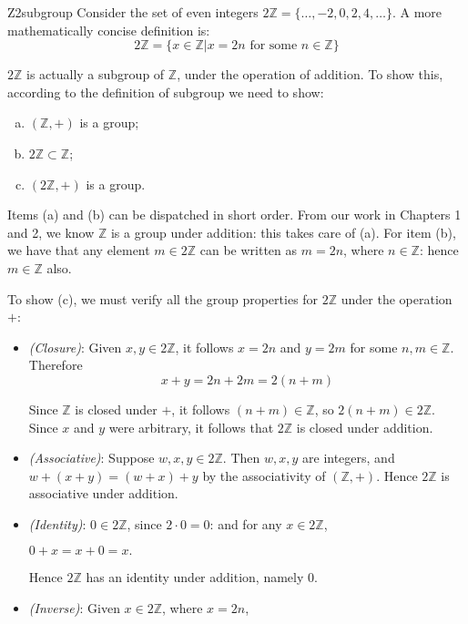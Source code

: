 \begin{example}{Z2subgroup}
Consider the set of even integers $2{\mathbb Z} = \{ \ldots, -2, 0, 2, 4, \ldots \}$. A more mathematically concise definition is:
\[
2{\mathbb Z} = \{x \in {\mathbb Z} | x = 2n \mbox{ for some } n \in {\mathbb Z} \} \]

$2{\mathbb Z}$ is actually a subgroup of ${\mathbb Z}$, under the operation of addition. To show this, according to the definition of subgroup we need to show:

\begin{enumerate}[(a)]
\item
$({\mathbb Z}, +)$ is a group;
\item
$2{\mathbb Z} \subset {\mathbb Z}$;
\item
$(2{\mathbb Z}, +)$ is a group.  
\end{enumerate}

\noindent
Items (a) and (b) can be dispatched in short order. 
From our work in Chapters 1 and 2, we know ${\mathbb Z}$ is a group under addition: this takes care of (a). For item (b), we have that any element   $m \in 2{\mathbb Z}$ can be written as $m=2n$, where $n \in {\mathbb Z}$: hence $m \in {\mathbb Z}$ also.

To show (c), we must verify all the group properties for $2{\mathbb Z}$ under the operation $+$:
\begin{itemize}
\item \emph{(Closure)}: 
Given $x, y \in 2{\mathbb Z}$, it follows $x = 2n$ and $y = 2m$ for some $n, m \in {\mathbb Z}$.  Therefore
\[
x + y = 2n + 2m = 2(n + m) \]

Since ${\mathbb Z}$ is closed under $+$, it follows $(n + m) \in {\mathbb Z}$, so $2(n+m) \in 2{\mathbb Z}$. Since $x$ and $y$ were arbitrary, it follows that $2{\mathbb Z}$ is closed under addition.
\item \emph{(Associative)}:  
Suppose $w, x, y \in  2{\mathbb Z}$.  Then  $w, x, y$ are integers, and  
$w + (x + y) = (w + x) + y$ by the associativity of $({\mathbb Z}, +)$.  
Hence $2{\mathbb Z}$ is associative under addition.
\item \emph{(Identity)}: 
$0  \in  2{\mathbb Z}$, since $2 \cdot 0 = 0$: and for any $x \in  2{\mathbb Z}$, 
\medskip

$0 + x = x + 0 = x.$
\medskip

\noindent
Hence $ 2{\mathbb Z}$ has an identity under addition, namely $0$.
\item \emph{(Inverse)}: 
Given $x \in  2{\mathbb Z}$, where $x = 2n$,
\medskip


\end{itemize}
\end{example}

